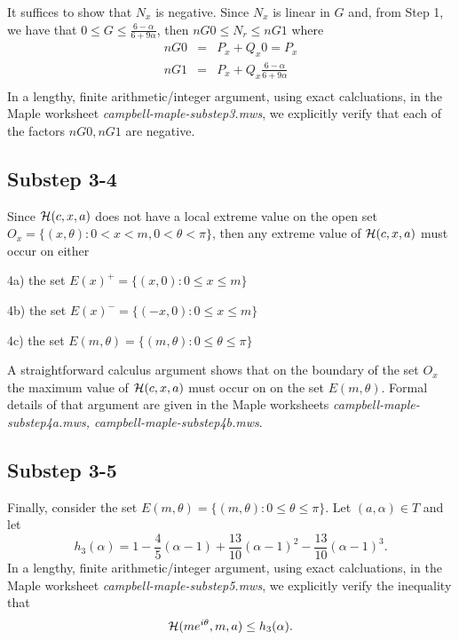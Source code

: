 \documentclass[12pt]{article}
\newcommand{\ds}{\displaystyle}
\begin{document}
It suffices to show that $N_x$ is negative. Since $N_x$ is linear in $G$ and, from Step 1, we have that 
${\ds 0 \le G \le \frac{6-\alpha}{6+9\alpha} }$, then $nG0 \le N_r \le nG1$
where
\begin{eqnarray*}
nG0 &=& P_x + Q_x 0  = P_x\\
nG1 &=& P_x + Q_x \frac{6-\alpha}{6+9\alpha} \\
\end{eqnarray*}
In a lengthy, finite arithmetic/integer argument, using exact calcluations, in the Maple worksheet 
{\em campbell-maple-substep3.mws}, we explicitly verify that each of the factors \linebreak $nG0, nG1$ are negative.

\subsection{Substep 3-4} 
Since ${\cal H}(c,x,a)$ does not have a local extreme value on the open 
set $O_x = \{(x,\theta) : 0 < x < m, 0 < \theta < \pi \}$, then any extreme value of ${\cal H}(c,x,a)$ must occur on either 

\vspace{0.05in}

4a) the set $E(x)^{+} = \{(x,0) : 0 \le x \le m \}$

4b) the set $E(x)^{-} =\{(-x,0) : 0 \le x \le m \}$

4c) the set $E(m,\theta) = \{(m,\theta) : 0 \le \theta \le \pi \}$

\vspace{0.05in}

A straightforward calculus argument shows that on the boundary of the set $O_x$ 
the maximum value of ${\cal H}(c,x,a)$ must occur on on the set $E(m,\theta)$. 
Formal details of that argument are given in the Maple worksheets 
{\em campbell-maple-substep4a.mws, campbell-maple-substep4b.mws}.

\subsection{Substep 3-5}
Finally, consider the set $E(m,\theta) = \{(m,\theta) : 0 \le \theta \le \pi \}$. 
Let $(a,\alpha) \in T$ and let  
\begin{equation} \label{last}
h_3(\alpha) = 1 - \frac{4}{5}(\alpha-1) + \frac{13}{10}(\alpha-1)^2 - \frac{13}{10}(\alpha-1)^3 .
\end{equation}  
In a lengthy, finite arithmetic/integer argument, using exact calcluations, in the Maple worksheet 
{\em campbell-maple-substep5.mws}, we explicitly verify the inequality that 
$${\cal H}(me^{i\theta},m,a) \le h_3(\alpha) .$$
\end{document}
